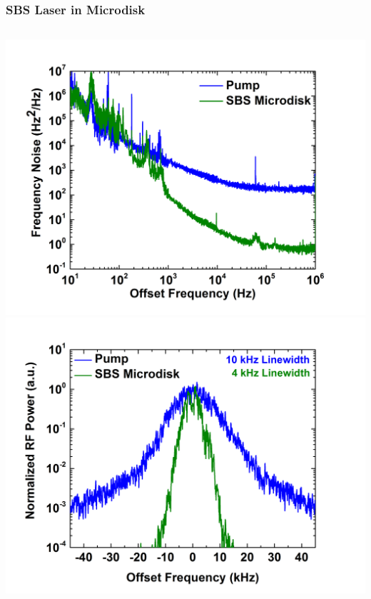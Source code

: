 \documentclass{beamer}
\begin{document}
\begin{frame}\frametitle{SBS Laser in Microdisk}
\begin{columns}
\includegraphics[width=1.0\textwidth]{Images/Freq_Noise_Comparison_Plot1.png}\\
\includegraphics[width=1.0\textwidth]{Images/RF_Spectrum_Plot1.png}


\end{columns}
\end{frame}
\end{document}
